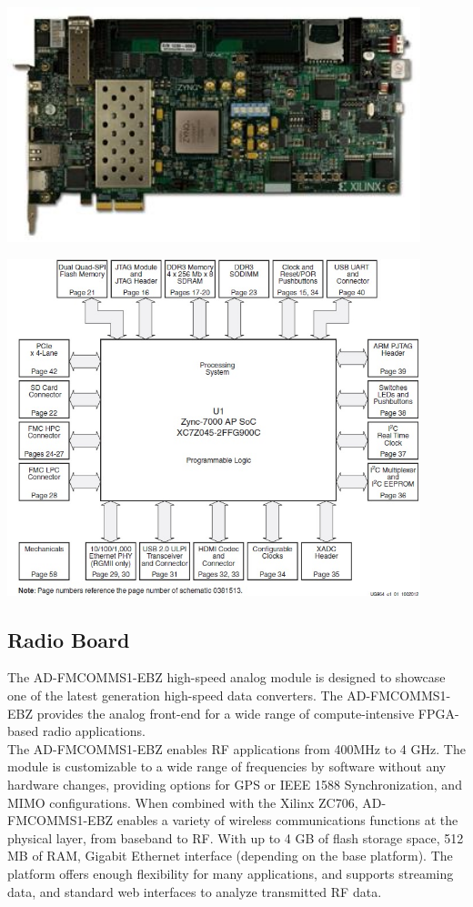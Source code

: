 \begin{center}
\includegraphics[width=12cm]{content/fig/ZC706.JPG}
\end{center}

\begin{center}
\includegraphics[width=12cm]{content/fig/zc706_block_diagram.JPG}
\end{center}

\subsection{Radio Board}

The AD-FMCOMMS1-EBZ high-speed analog module is designed to showcase one of the latest generation high-speed data converters. The AD-FMCOMMS1-EBZ provides the analog front-end for a wide range of compute-intensive FPGA-based radio applications.\\
The AD-FMCOMMS1-EBZ enables RF applications from 400MHz to 4 GHz. The module is customizable to a wide range of frequencies by software without any hardware changes, providing options for GPS or IEEE 1588 Synchronization, and MIMO configurations. When combined with the Xilinx ZC706, AD-FMCOMMS1-EBZ enables a variety of wireless communications functions at the physical layer, from baseband to RF. With up to 4 GB of flash storage space, 512 MB of RAM, Gigabit Ethernet interface (depending on the base platform). The platform offers enough flexibility for many applications, and supports streaming data, and standard web interfaces to analyze transmitted RF data.\\


